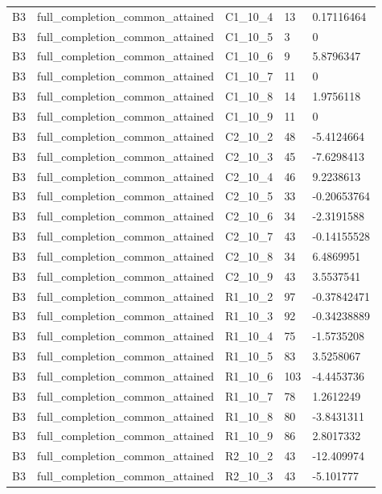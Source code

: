 \begin{longtable}{lllll}
B3 & full\_completion\_common\_attained & C1\_10\_4 & 13 & 0.17116464 \\
B3 & full\_completion\_common\_attained & C1\_10\_5 & 3 & 0 \\
B3 & full\_completion\_common\_attained & C1\_10\_6 & 9 & 5.8796347 \\
B3 & full\_completion\_common\_attained & C1\_10\_7 & 11 & 0 \\
B3 & full\_completion\_common\_attained & C1\_10\_8 & 14 & 1.9756118 \\
B3 & full\_completion\_common\_attained & C1\_10\_9 & 11 & 0 \\
B3 & full\_completion\_common\_attained & C2\_10\_2 & 48 & -5.4124664 \\
B3 & full\_completion\_common\_attained & C2\_10\_3 & 45 & -7.6298413 \\
B3 & full\_completion\_common\_attained & C2\_10\_4 & 46 & 9.2238613 \\
B3 & full\_completion\_common\_attained & C2\_10\_5 & 33 & -0.20653764 \\
B3 & full\_completion\_common\_attained & C2\_10\_6 & 34 & -2.3191588 \\
B3 & full\_completion\_common\_attained & C2\_10\_7 & 43 & -0.14155528 \\
B3 & full\_completion\_common\_attained & C2\_10\_8 & 34 & 6.4869951 \\
B3 & full\_completion\_common\_attained & C2\_10\_9 & 43 & 3.5537541 \\
B3 & full\_completion\_common\_attained & R1\_10\_2 & 97 & -0.37842471 \\
B3 & full\_completion\_common\_attained & R1\_10\_3 & 92 & -0.34238889 \\
B3 & full\_completion\_common\_attained & R1\_10\_4 & 75 & -1.5735208 \\
B3 & full\_completion\_common\_attained & R1\_10\_5 & 83 & 3.5258067 \\
B3 & full\_completion\_common\_attained & R1\_10\_6 & 103 & -4.4453736 \\
B3 & full\_completion\_common\_attained & R1\_10\_7 & 78 & 1.2612249 \\
B3 & full\_completion\_common\_attained & R1\_10\_8 & 80 & -3.8431311 \\
B3 & full\_completion\_common\_attained & R1\_10\_9 & 86 & 2.8017332 \\
B3 & full\_completion\_common\_attained & R2\_10\_2 & 43 & -12.409974 \\
B3 & full\_completion\_common\_attained & R2\_10\_3 & 43 & -5.101777 \\

\end{longtable}
